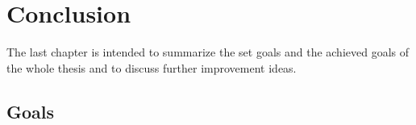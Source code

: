 \chapter{Conclusion}
\label{chp:conclusion}

The last chapter is intended to summarize the set goals and the achieved goals of the whole thesis and to discuss further improvement ideas. 

\section{Goals}

